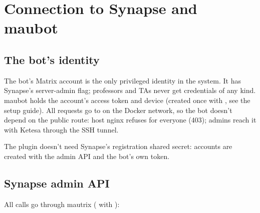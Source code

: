 \chapter{Connection to Synapse and maubot}
\label{ch:synapse}

\section{The bot's identity}

The bot's Matrix account  is the only privileged identity in the system. It
has Synapse's server-admin flag; professors and TAs never get credentials of any kind.
maubot holds the account's access token and device (created once with , see
the setup guide). All requests go to  on the Docker network, so the
bot doesn't depend on the public route: host nginx refuses  for everyone
(403); admins reach it with Ketesa through the SSH tunnel.

The plugin doesn't need Synapse's registration shared secret: accounts are created with the
admin API and the bot's own token.

\section{Synapse admin API}

All calls go through mautrix ( with ):

